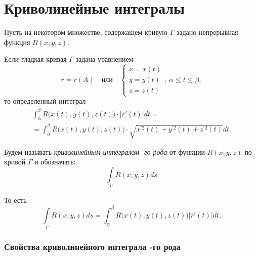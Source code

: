 \chapter{Криволинейные интегралы}

\begin{note}
    Пусть на некотором множестве, содержащем кривую $ \Gamma $ задано непрерывная функция $ R(x,y,z) $.

    Если гладкая кривая $ \Gamma $ задана уравнением
    \[
        \overline{r} = \overline{r}(A) \quad \text{или} \quad \left\{\begin{array}{l}
            x = x(t) \\
            y = y(t) \\
            z = z(t)
        \end{array}\right., \ \alpha \leqslant t \leqslant\beta,
    \]
    то определенный интеграл
    \begin{multline*}
        \int_{\alpha}^{\beta}R\big(x(t),y(t),z(t)\big)\cdot \big|\overline{r}'(t)\big|dt = \\
        = \int_{\alpha}^{\beta}R\bigl(x(t),y(t),z(t)\bigr)\cdot\sqrt{x^{'2}(t) + y^{'2}(t) + z^{'2}(t)}dt.
    \end{multline*}

    Будем называть \emph{криволинейным интегралом -го рода} от функции $ R(x,y,z) $ по кривой $ \Gamma $ и обозначать:
    \[
        \boxed{\int\limits_\Gamma R(x,y,z)ds}
    \]

    То есть
    \[
        \int\limits_\Gamma R(x,y,z)ds = \int_{\alpha}^{\beta}R\big(x(t),y(t),z(t)\big)\big|\overline{r}'(t)\big|dt.
    \]
\end{note}

\subsection{Свойства криволинейного интеграла -го рода}

